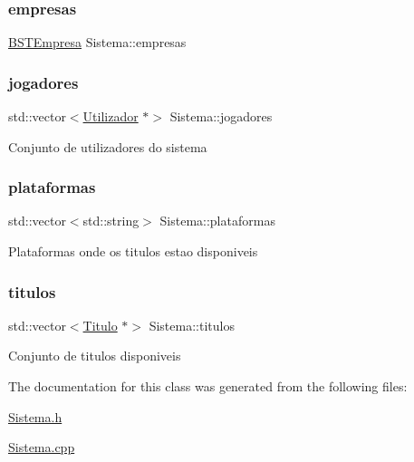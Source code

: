 \subsubsection{\texorpdfstring{empresas}{empresas}}
{\footnotesize\ttfamily \mbox{\hyperlink{_sistema_8h_a01003fd698337e71bc8e8addc8121117}{B\+S\+T\+Empresa}} Sistema\+::empresas\hspace{0.3cm}{\ttfamily [private]}}

\mbox{\label{class_sistema_a940c20d39559da85af211390fd952726}} 
\subsubsection{\texorpdfstring{jogadores}{jogadores}}
{\footnotesize\ttfamily std\+::vector$<$\mbox{\hyperlink{class_utilizador}{Utilizador}} $\ast$$>$ Sistema\+::jogadores\hspace{0.3cm}{\ttfamily [private]}}

Conjunto de utilizadores do sistema \mbox{\label{class_sistema_ab467836c1a7e4291614f93cafb25e9f2}} 
\subsubsection{\texorpdfstring{plataformas}{plataformas}}
{\footnotesize\ttfamily std\+::vector$<$std\+::string$>$ Sistema\+::plataformas\hspace{0.3cm}{\ttfamily [private]}}

Plataformas onde os titulos estao disponiveis \mbox{\label{class_sistema_a1b412fc420c5592ed2eb111606b7b9d8}} 
\subsubsection{\texorpdfstring{titulos}{titulos}}
{\footnotesize\ttfamily std\+::vector$<$\mbox{\hyperlink{class_titulo}{Titulo}} $\ast$$>$ Sistema\+::titulos\hspace{0.3cm}{\ttfamily [private]}}

Conjunto de titulos disponiveis 

The documentation for this class was generated from the following files\+:\begin{DoxyCompactItemize}
\item 
\mbox{\hyperlink{_sistema_8h}{Sistema.\+h}}\item 
\mbox{\hyperlink{_sistema_8cpp}{Sistema.\+cpp}}\end{DoxyCompactItemize}
